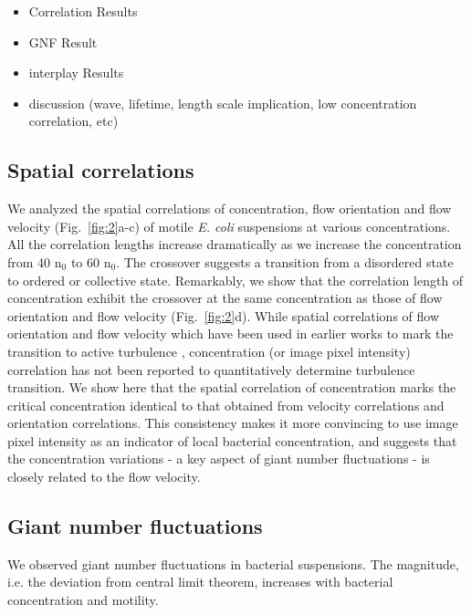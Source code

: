 \documentclass[twocolumn,aps,pre,amsmath,amssymb,floatfix,longbibliography]{revtex4-1}
\begin{document}
\begin{itemize}
\item Correlation Results
\item GNF Result
\item interplay Results
\item discussion (wave, lifetime, length scale implication, low concentration correlation, etc)
\end{itemize}

\subsection{Spatial correlations}
We analyzed the spatial correlations of concentration, flow orientation and flow velocity (Fig.~\ref{fig:2}a-c) of motile \textit{E. coli} suspensions at various concentrations. All the correlation lengths increase dramatically as we increase the concentration from 40 n$_0$ to 60 n$_0$. The crossover suggests a transition from a disordered state to ordered or collective state. Remarkably, we show that the correlation length of concentration exhibit the crossover at the same concentration as those of flow orientation and flow velocity (Fig.~\ref{fig:2}d). While spatial correlations of flow orientation and flow velocity which have been used in earlier works to mark the transition to active turbulence \cite{Wensink14308, PhysRevLett.110.228102}, concentration (or image pixel intensity) correlation has not been reported to quantitatively determine turbulence transition. We show here that the spatial correlation of concentration marks the critical concentration identical to that obtained from velocity correlations and orientation correlations. This consistency makes it more convincing to use image pixel intensity as an indicator of local bacterial concentration, and suggests that the concentration variations - a key aspect of giant number fluctuations - is closely related to the flow velocity.

\subsection{Giant number fluctuations}
We observed giant number fluctuations in bacterial suspensions. The magnitude, i.e. the deviation from central limit theorem, increases with bacterial concentration and motility.
\end{document}
